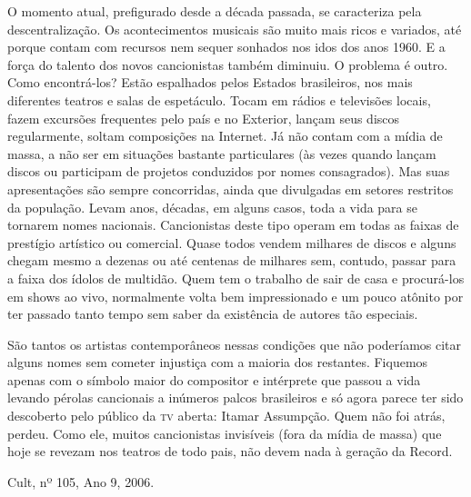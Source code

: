 O momento atual, prefigurado desde a década passada, se caracteriza pela
descentralização. Os acontecimentos musicais são muito mais ricos e
variados, até porque contam com recursos nem sequer sonhados nos idos
dos anos 1960. E a força do talento dos novos cancionistas também
diminuiu. O problema é outro. Como encontrá-los? Estão espalhados pelos
Estados brasileiros, nos mais diferentes teatros e salas de espetáculo.
Tocam em rádios e televisões locais, fazem excursões frequentes pelo
país e no Exterior, lançam seus discos regularmente, soltam composições
na Internet. Já não contam com a mídia de massa, a não ser em situações
bastante particulares (às vezes quando lançam discos ou participam de
projetos conduzidos por nomes consagrados). Mas suas apresentações são
sempre concorridas, ainda que divulgadas em setores restritos da
população. Levam anos, décadas, em alguns casos, toda a vida para se
tornarem nomes nacionais. Cancionistas deste tipo operam em todas as
faixas de prestígio artístico ou comercial. Quase todos vendem milhares
de discos e alguns chegam mesmo a dezenas ou até centenas de milhares
sem, contudo, passar para a faixa dos ídolos de multidão. Quem tem o
trabalho de sair de casa e procurá-los em shows ao vivo, normalmente
volta bem impressionado e um pouco atônito por ter passado tanto tempo
sem saber da existência de autores tão especiais.

São tantos os artistas contemporâneos nessas condições que não
poderíamos citar alguns nomes sem cometer injustiça com a maioria dos
restantes. Fiquemos apenas com o símbolo maior do compositor e
intérprete que passou a vida levando pérolas cancionais a inúmeros
palcos brasileiros e só agora parece ter sido descoberto pelo público da
\textsc{tv} aberta: Itamar Assumpção. Quem não foi atrás, perdeu. Como ele,
muitos cancionistas invisíveis (fora da mídia de massa) que hoje se
revezam nos teatros de todo pais, não devem nada à geração da Record.

Cult, nº 105, Ano 9, 2006.


